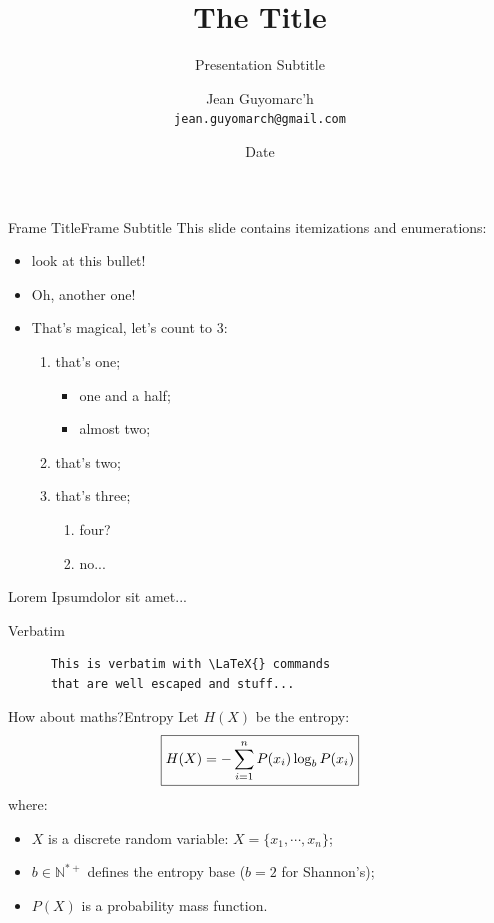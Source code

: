 \documentclass[aspectratio=169]{beamer}
\title[Short Title]{The Title}
\subtitle{Presentation Subtitle}
\date[\textbackslash{}today]{Date}
\author[Jean Guyomarc'h]{Jean Guyomarc'h\\\texttt{jean.guyomarch@gmail.com}}
\begin{document}
\begin{frame}
\titlepage
\end{frame}


\begin{frame}{Frame Title}{Frame Subtitle}
   This slide contains itemizations and enumerations:
   \begin{itemize}
      \item look at this bullet!
      \item Oh, another one!
      \item That's magical, let's count to 3:
         \begin{enumerate}
            \item that's one;
               \begin{itemize}
                  \item one and a half;
                  \item almost two;
               \end{itemize}
            \item that's two;
            \item that's three;
               \begin{enumerate}
                  \item four?
                  \item no...
               \end{enumerate}
         \end{enumerate}
   \end{itemize}
\end{frame}

\begin{frame}{Lorem Ipsum}{dolor sit amet...}
   \lipsum[1]
\end{frame}


\begin{frame}[fragile]{Verbatim}
   \begin{verbatim}
      This is verbatim with \LaTeX{} commands
      that are well escaped and stuff...
   \end{verbatim}
\end{frame}

\begin{frame}{How about maths?}{Entropy}
   Let $H(X)$ be the entropy:
   \[%
      \boxed{%
         H(X) = -\sum_{i=1}^{n}{P(x_i)\log_bP(x_i)}
      }
   \]
   where:
   \begin{itemize}
      \item $X$ is a discrete random variable: $X=\{x_1, \cdots, x_n\}$;
      \item $b \in \mathbb{N}^{*+}$ defines the entropy base ($b=2$ for Shannon's);
      \item $P(X)$ is a probability mass function.
   \end{itemize}
\end{frame}
\end{document}
